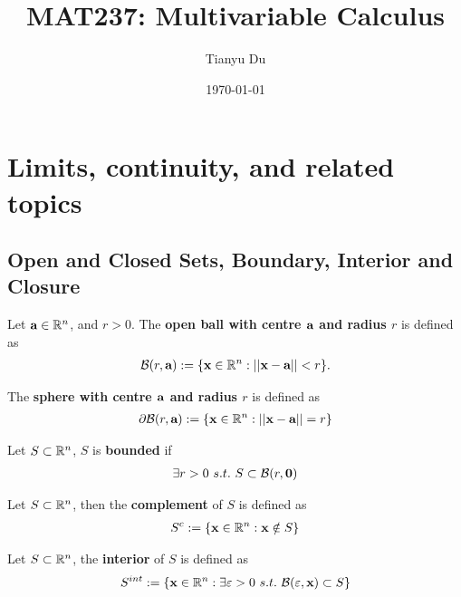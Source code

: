 \documentclass[11pt]{article}
\title{MAT237: Multivariable Calculus}
\date{\today}
\author{Tianyu Du}
\begin{document}
	\maketitle
	\tableofcontents
	\newpage
	
	\section{Limits, continuity, and related topics}
		\subsection{Open and Closed Sets, Boundary, Interior and Closure}
			\begin{definition}
				Let $\textbf{a} \in \mathbb{R}^n$, and $r > 0$. The \textbf{open ball with centre $\textbf{a}$ and radius $r$} is defined as
				\begin{gather}
					\mathcal{{B}}(r, \textbf{a}) := \{ \textbf{x} \in \mathbb{R}^n : \vert \vert {\textbf{x} - \textbf{a}} \vert \vert< r\}.
				\end{gather}
			\end{definition}
			
			\begin{definition}
				The \textbf{sphere with centre $\textbf{a}$ and radius $r$} is defined as
				\begin{gather}
					\partial \mathcal{{B}}(r, \textbf{a}) := \{\textbf{x} \in \mathbb{R}^n: \vert \vert {\textbf{x} - \textbf{a}} \vert \vert = r\}
				\end{gather}
			\end{definition}
			
			\begin{definition}
				Let $S \subset \mathbb{R}^n$, $S$ is \textbf{bounded} if 
				\begin{gather}
					\exists r > 0\ s.t.\ S \subset \mathcal{{B}}(r, \textbf{0})
				\end{gather}
			\end{definition}
			
			\begin{definition}
				Let $S \subset \mathbb{R}^n$, then the \textbf{complement} of $S$ is defined as 
				\begin{gather}
					S^c := \{\textbf{x} \in \mathbb{R}^n: \textbf{x} \notin S\}
				\end{gather}
			\end{definition}
			
			\begin{definition}
				Let $S \subset \mathbb{R}^n$, the \textbf{interior} of $S$ is defined as
				\begin{gather}
					S^{int} := \{\textbf{x} \in \mathbb{R}^n: \exists \varepsilon > 0\ s.t.\ \mathcal{{B}}(\varepsilon, \textbf{x}) \subset S\}
				\end{gather}
			\end{definition}
			
\end{document}
